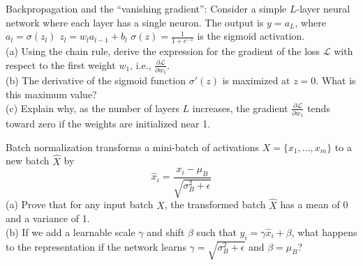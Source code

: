 \begin{myexercise}
Backpropagation and the ``vanishing gradient'':
Consider a simple $L$-layer neural network where each layer has a single neuron. The output is $y = a_L$, where
$a_l = \sigma(z_l)$
$z_l = w_l a_{l-1} + b_l$
$\sigma(z) = \frac{1}{1 + e^{-z}}$ is the sigmoid activation.\\
(a) Using the chain rule, derive the expression for the gradient of the loss $\mathcal{L}$ with respect to the first weight $w_1$, i.e., $\frac{\partial \mathcal{L}}{\partial w_1}$.\\
(b) The derivative of the sigmoid function $\sigma'(z)$ is maximized at $z=0$. What is this maximum value? \\
(c) Explain why, as the number of layers $L$ increases, the gradient $\frac{\partial \mathcal{L}}{\partial w_1}$ tends toward zero if the weights are initialized near 1.
\end{myexercise}


\begin{myexercise}
Batch normalization transforms a mini-batch of activations $X = \{x_1, \dots, x_m\}$ to a new batch $\hat{X}$ by
$$\hat{x}_i = \frac{x_i - \mu_B}{\sqrt{\sigma_B^2 + \epsilon}}$$
(a) Prove that for any input batch $X$, the transformed batch $\hat{X}$ has a mean of 0 and a variance of 1.\\
(b) If we add a learnable scale $\gamma$ and shift $\beta$ such that $y_i = \gamma \hat{x}_i + \beta$, what happens to the representation if the network learns $\gamma = \sqrt{\sigma_B^2 + \epsilon}$ and $\beta = \mu_B$?
\end{myexercise}

